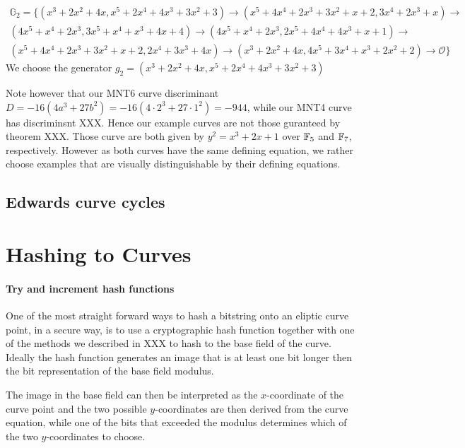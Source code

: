 \begin{multline*}
\mathbb{G}_2=\{ 
(x^3+2x^2+4x,x^5+2x^4+4x^3+3x^2+3)\to
(x^5+4x^4+2x^3+3x^2+x+2,3x^4+2x^3+x)\to\\
(4x^5+x^4+2x^3,3x^5+x^4+x^3+4x+4)\to
(4x^5+x^4+2x^3,2x^5+4x^4+4x^3+x+1) \to\\
(x^5+4x^4+2x^3+3x^2+x+2,2x^4+3x^3+4x)\to
(x^3+2x^2+4x,4x^5+3x^4+x^3+2x^2+2)\to
\mathcal{O}\}
\end{multline*}
We choose the generator $g_2 = (x^3+2x^2+4x,x^5+2x^4+4x^3+3x^2+3)$

\begin{remark}
Note however that our MNT6 curve discriminant $D=-16(4a^3 + 27 b^2)= -16(4\cdot 2^3 + 27\cdot 1^2)=-944$, while our MNT4 curve has discriminsnt XXX. Hence our example curves are not those guranteed by theorem XXX. Those curve are both given by $y^2= x^3 + 2x +1$ over $\mathbb{F}_5$ and $\mathbb{F}_7$, respectively. However as both curves have the same defining equation, we rather choose examples that are visually distinguishable by their defining equations.




\end{remark}

\subsection{Edwards curve cycles}


\section{Hashing to Curves} 

\paragraph{Try and increment hash functions}
One of the most straight forward ways to hash a bitstring onto an eliptic curve point, in a  secure way, is to use a cryptographic hash function together with one of the methods we described in XXX to hash to the base field of the curve. Ideally the hash function generates an image that is at least one bit longer then the bit representation of the base field modulus.

The image in the base field can then be interpreted as the $x$-coordinate of the curve point and the two possible $y$-coordinates are then derived from the curve equation, while one of the bits that exceeded the modulus determines which of the two $y$-coordinates to choose.

